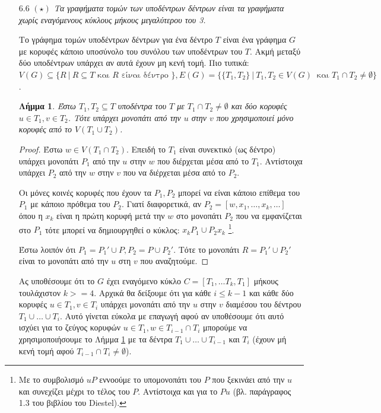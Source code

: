 \documentclass[a4paper, oneside, 11pt]{article}
\newtheorem{lm}[thm]{Λήμμα}
\theoremstyle{definition}
\begin{document}
\begin{enumerate}
   \item[6.6] \emph{$(\star)$ Τα γραφήματα τομών των υποδέντρων
   δέντρων είναι τα γραφήματα χωρίς εναγόμενους κύκλους μήκους μεγαλύτερου
   του 3.}

   Το γράφημα τομών υποδέντρων δέντρων για ένα δέντρο $T$ είναι ένα
   γράφημα $G$ με κορυφές κάποιο υποσύνολο του συνόλου των υποδέντρων του
   $T$. Ακμή
   μεταξύ δύο υποδέντρων υπάρχει αν αυτά έχουν μη κενή τομή.
   Πιο τυπικά: $V(G) \subseteq \{ R\ |\ R \subseteq T \text{ και }
   R \text{ είναι δέντρο } \}, E(G) = \{ \{T_1, T_2\}\ |\ T_1, T_2 \in V(G)\
   \text{ και } T_1 \cap T_2 \neq \emptyset \}$.

   \begin{lm}
      \label{lm6.6.1}
      Έστω $T_1, T_2 \subseteq T$ υποδέντρα του $T$ με $T_1 \cap T_2 \neq
      \emptyset$ και δύο κορυφές $u \in T_1, v \in T_2$. Τότε υπάρχει μονοπάτι
      από την $u$ στην $v$ που χρησιμοποιεί μόνο κορυφές από το
      $V(T_1 \cup T_2)$.
   \end{lm}
   \begin{proof}
      Έστω $w \in V(T_1 \cap T_2)$. Επειδή το $T_1$ είναι συνεκτικό (ως δέντρο)
      υπάρχει μονοπάτι $P_1$ από την $u$ στην $w$ που διέρχεται μέσα
      από το $T_1$. Αντίστοιχα υπάρχει $P_2$ από την $w$ στην $v$
      που να διέρχεται μέσα από το $P_2$.

      Οι μόνες κοινές κορυφές που έχουν τα $P_1, P_2$ μπορεί να είναι
      κάποιο επίθεμα του $P_1$ με κάποιο πρόθεμα του $P_2$.
      Γιατί διαφορετικά, αν $P_2 = [w, x_1, \ldots, x_k, \ldots]$
      όπου η $x_k$ είναι η πρώτη κορυφή μετά την $w$ στο μονοπάτι
      $P_2$ που να εμφανίζεται στο $P_1$ τότε μπορεί να δημιουργηθεί
      ο κύκλος: $x_kP_1 \cup P_2x_k$ \footnote{Με το συμβολισμό
      $uP$ εννοούμε το υπομονοπάτι του $P$ που ξεκινάει από την $u$
      και συνεχίζει μέχρι το τέλος του $P$. Αντίστοιχα και για το $Pu$
      (βλ. παράγραφος 1.3 του βιβλίου του Diestel).}.

      Έστω λοιπόν ότι $P_1 = P_1' \cup P, P_2 = P \cup P_2'$.
      Τότε το μονοπάτι $R = P_1' \cup P_2'$ είναι το μονοπάτι
      από την $u$ στη $v$ που αναζητούμε.
   \end{proof}

   Ας υποθέσουμε ότι το $G$ έχει εναγόμενο κύκλο $C = [T_1, \ldots T_{k},
   T_1]$ μήκους τουλάχιστον $k >= 4$. Αρχικά θα δείξουμε ότι για κάθε
   $i \leq k-1$ και κάθε δύο κορυφές $u \in T_1, v \in T_i$ υπάρχει
   μονοπάτι από την $u$ στην $v$ διαμέσου του δέντρου $T_1 \cup \ldots \cup
   T_i$. Αυτό γίνεται εύκολα με επαγωγή αφού αν υποθέσουμε
   ότι αυτό ισχύει για το ζεύγος κορυφών $u \in T_1, w \in T_{i-1} \cap T_i$
   μπορούμε να χρησιμοποιήσουμε το Λήμμα \ref{lm6.6.1} με τα δέντρα
   $T_1 \cup \ldots \cup T_{i-1}$ και $T_i$ (έχουν μή κενή τομή αφού
   $T_{i-1} \cap T_i \neq \emptyset$).


\end{enumerate}
\end{document}
